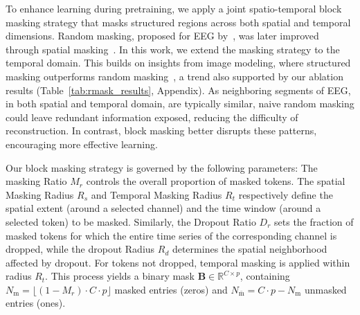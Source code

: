 \documentclass{article}
\newcommand{\bigbar}[1]{\overline{#1}}
\begin{document}
To enhance learning during pretraining, we apply a joint spatio-temporal block masking strategy that masks structured regions across both spatial and temporal dimensions. Random masking, proposed for EEG by~\citet{chien2022maeeg}, was later improved through spatial masking~\citep{mohammadi2024eeg2rep, guetschel2024s}.  In this work, we extend the masking strategy to the temporal domain. This builds on insights from image modeling, where structured masking outperforms random masking~\citep{xie2022simmim}, a trend also supported by our ablation results (Table~\ref{tab:rmask_results}, Appendix). As neighboring segments of EEG, in both spatial and temporal domain, are typically similar, naive random masking could leave redundant information exposed, reducing the difficulty of reconstruction. In contrast, block masking better disrupts these patterns, encouraging more effective learning.


Our block masking strategy is governed by the following parameters: The masking Ratio $M_r$ controls the overall proportion of masked tokens. The spatial Masking Radius $R_s$ and Temporal Masking Radius $R_t$ respectively define the spatial extent (around a selected channel) and the time window (around a selected token) to be masked. Similarly, the Dropout Ratio $D_r$ sets the fraction of masked tokens for which the entire time series of the corresponding channel is dropped, while the dropout Radius $R_d$ determines the spatial neighborhood affected by dropout. For tokens not dropped, temporal masking is applied within radius $R_t$. This process yields a binary mask $\mathbf{B} \in \mathbb{R}^{C \times p}$, containing $N_{\text{m}} = \lfloor (1 - M_r) \cdot C \cdot p \rfloor$ masked entries (zeros) and $N_{\bar{\text{m}}} = C \cdot p - N_{\text{m}}$ unmasked entries (ones).
\end{document}
